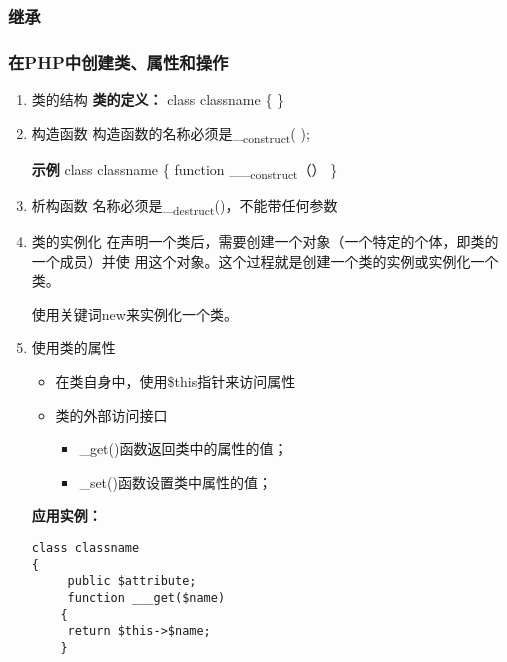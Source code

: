 \documentclass[11pt]{article}
\begin{document}
\subsubsection{继承}
\label{sec:org0978e86}
\subsubsection{在PHP中创建类、属性和操作}
\label{sec:orgc94f075}
\begin{enumerate}
\item 类的结构
\label{sec:org2395c23}
\textbf{类的定义：}
class classname
\{
\}
\item 构造函数
\label{sec:orge03d00f}
构造函数的名称必须是\_\textsubscript{construct}( );

\textbf{示例}
class classname
\{
      function \_\_\textsubscript{construct}（）
\}
\item 析构函数
\label{sec:org477f0a3}
名称必须是\_\textsubscript{destruct}()，不能带任何参数
\item 类的实例化
\label{sec:org3a970a7}
在声明一个类后，需要创建一个对象（一个特定的个体，即类的一个成员）并使
用这个对象。这个过程就是创建一个类的实例或实例化一个类。

使用关键词new来实例化一个类。
\item 使用类的属性
\label{sec:org4630dee}
\begin{itemize}
\item 在类自身中，使用\$this指针来访问属性
\item 类的外部访问接口
\begin{itemize}
\item \_get()函数返回类中的属性的值；
\item \_set()函数设置类中属性的值；
\end{itemize}
\end{itemize}

\textbf{应用实例：}
\begin{verbatim}
class classname
{
     public $attribute;
     function ___get($name)
    {
	 return $this->$name;
    }


\end{verbatim}
\end{enumerate}
\end{document}
